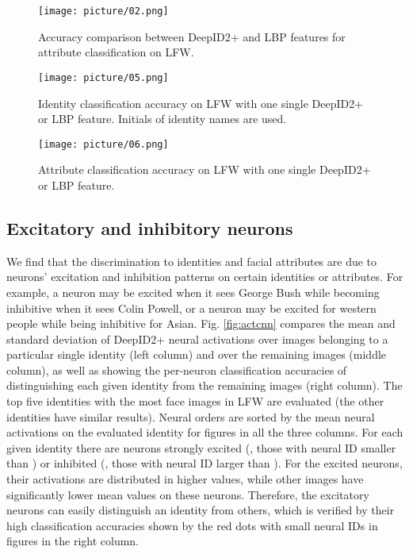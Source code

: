 \documentclass[10pt,twocolumn,letterpaper]{article}
\begin{document}
\begin{figure}[t]
\begin{center}
\texttt{[image: picture/02.png]}
\end{center}
\vspace{-0.15in}
\caption{Accuracy comparison between DeepID2+ and LBP features for attribute classification on LFW.}
\label{fig:attribute_cv}
\vspace{-0.1in}
\end{figure}

\begin{figure}[t]
\begin{center}
\texttt{[image: picture/05.png]}
\end{center}
\vspace{-0.15in}
\caption{Identity classification accuracy on LFW with one single DeepID2+ or LBP feature. Initials of identity names are used.}
\label{fig:identity_sel}
\vspace{-0.1in}
\end{figure}

\begin{figure}[t]
\begin{center}
\texttt{[image: picture/06.png]}
\end{center}
\vspace{-0.15in}
\caption{Attribute classification accuracy on LFW with one single DeepID2+ or LBP feature.}
\label{fig:attribute_sel}
\vspace{-0.1in}
\end{figure}

\subsection{Excitatory and inhibitory neurons}
We find that the discrimination to identities and facial attributes are due to neurons' excitation and inhibition patterns on certain identities or attributes. For example, a neuron may be excited when it sees George Bush while becoming inhibitive when it sees Colin Powell, or a neuron may be excited for western people while being inhibitive for Asian. Fig. \ref{fig:actcnn} compares the mean and standard deviation of DeepID2+ neural activations over images belonging to a particular single identity (left column) and over the remaining images (middle column), as well as showing the per-neuron classification accuracies of distinguishing each given identity from the remaining images (right column). The top five identities with the most face images in LFW are evaluated (the other identities have similar results). Neural orders are sorted by the mean neural activations on the evaluated identity for figures in all the three columns. For each given identity there are neurons strongly excited (\eg, those with neural ID smaller than ) or inhibited (\eg, those with neural ID larger than ). For the excited neurons, their activations are distributed in higher values, while  other images have significantly lower mean values on these neurons. Therefore, the excitatory neurons can easily distinguish an identity from others, which is verified by their high classification accuracies shown by the red dots with small neural IDs in figures in the right column.
\end{document}

